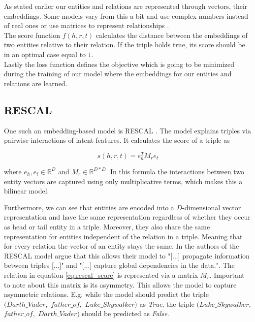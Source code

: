 As stated earlier our entities and relations are represented through vectors, their embeddings. Some models vary from this a bit and use complex numbers instead of real ones \cite{trouillon_complex_2016}  or use matrices to represent relationships \cite{nickel_three-way_2011}.
\\
The score function $f(h,r,t)$ calculates the distance between the embeddings of two entities relative to their relation. If the triple holds true, its score should be in an optimal case equal to $1$. \\
Lastly the loss function defines the objective which is going to be minimized during the training of our model where the embeddings for our entities and relations are learned.

\subsection{RESCAL}
\label{cha:rescal}
One such an embedding-based model is RESCAL \cite{nickel_three-way_2011}\cite{nickel_factorizing_2012}. The model explains triples via pairwise interactions of latent features. It calculates the score of a triple as

\begin{equation}
\label{eq:rescal_score}
s(h,r,t)=e_h^T M_r e_t
\end{equation}

where $e_h, e_t \in \mathbb{R}^D$ and $M_r \in \mathbb{R}^{D*D}$. In this formula the interactions between two entity vectors are captured using only multiplicative terms, which makes this a bilinear model.

Furthermore, we can see that entities are encoded into a $D$-dimensional vector representation and have the same representation regardless of whether they occur as head or tail entity in a triple. Moreover, they also share the same representation for entities independent of the relation in a triple. Meaning that for every relation the vector of an entity stays the same. In \cite{nickel_review_2015} the authors of the RESCAL model argue that this allows their model to "[...] propagate information between triples [...]" and "[...] capture global dependencies in the data.". The relation in equation \ref{eq:rescal_score} is represented via a matrix $M_r$. Important to note about this matrix is its asymmetry. This allows the model to capture asymmetric relations. E.g. while the model should predict the triple $(Darth\_Vader,$ $ father\_of,$ $ Luke\_Skywalker)$ as \textit{True}, the triple $(Luke\_Skywalker,$ $ father\_of,$ $ Darth\_Vader)$ should be predicted as \textit{False}. 

